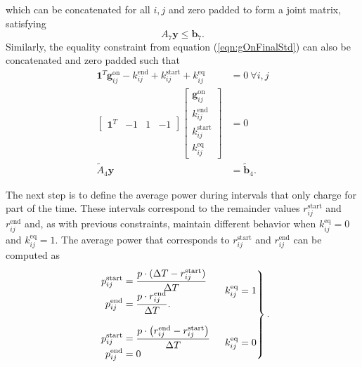 which can be concatenated for all $i,j$ and zero padded to form a joint matrix, satisfying 
\begin{equation}
	A_7\mathbf{y} \le \mathbf{b}_7.
\end{equation}
Similarly, the equality constraint from equation (\ref{eqn:gOnFinalStd}) can also be concatenated and zero padded such that
\begin{equation} \begin{aligned}
	\mathbf{1}^T\mathbf{g}_{ij}^{\text{on}} - k_{ij}^{\text{end}} + k_{ij}^{\text{start}} + k_{ij}^{\text{eq}} &= 0 \ \forall i,j\\
	\begin{bmatrix}\mathbf{1}^T & - 1 & 1 & -1\end{bmatrix} \begin{bmatrix}\mathbf{g}_{ij}^{\text{on}} \\ k_{ij}^{\text{end}} \\ k_{ij}^{\text{start}} \\ k_{ij}^{\text{eq}} \end{bmatrix} &= 0 \\
		\tilde{A}_4\mathbf{y} &= \tilde{\mathbf{b}}_4.
\end{aligned} \end{equation}
	\par The next step is to define the average power during intervals that only charge for part of the time.  These intervals correspond to the remainder values $r_{ij}^{\text{start}}$ and $r_{ij}^{\text{end}}$ and, as with previous constraints, maintain different behavior when $k_{ij}^{\text{eq}} = 0$ and $k_{ij}^{\text{eq}} = 1$. The average power that corresponds to $r_{ij}^{\text{start}}$ and $r_{ij}^{\text{end}}$ can be computed as 
\begin{equation}\label{eqn:avgPower1}\begin{aligned}
	\begin{rcases}
	\begin{array}{l} \begin{aligned}
		p^{\text{start}}_{ij} &= \frac{p\cdot (\Delta T - r^{\text{start}}_{ij})}{\Delta T}\\ 
		p^{\text{end}}_{ij} &= \frac{p\cdot r^{\text{end}}_{ij}}{\Delta T}.\\
	\end{aligned} \end{array} & k_{ij}^{\text{eq}} = 1 \\[8pt] 
	\begin{array}{l} \begin{aligned}
		p_{ij}^{\text{start}} &= \frac{p\cdot \left ( r_{ij}^{\text{end}} - r_{ij}^{\text{start}} \right )}{\Delta T} \\
		p_{ij}^{\text{end}} &= 0 \\
	\end{aligned} \end{array} & k_{ij}^{\text{eq}} = 0 \\
	\end{rcases}.
\end{aligned}\end{equation}
